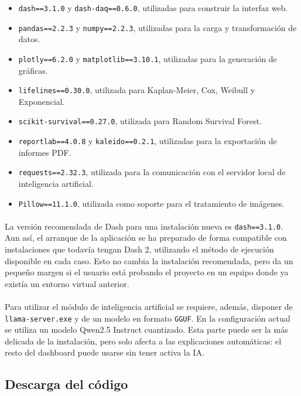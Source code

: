 \begin{itemize}
    \item \texttt{dash==3.1.0} y \texttt{dash-daq==0.6.0}, utilizadas para construir la interfaz web.
    \item \texttt{pandas==2.2.3} y \texttt{numpy==2.2.3}, utilizadas para la carga y transformación de datos.
    \item \texttt{plotly==6.2.0} y \texttt{matplotlib==3.10.1}, utilizadas para la generación de gráficas.
    \item \texttt{lifelines==0.30.0}, utilizada para Kaplan-Meier, Cox, Weibull y Exponencial.
    \item \texttt{scikit-survival==0.27.0}, utilizada para Random Survival Forest.
    \item \texttt{reportlab==4.0.8} y \texttt{kaleido==0.2.1}, utilizadas para la exportación de informes PDF.
    \item \texttt{requests==2.32.3}, utilizada para la comunicación con el servidor local de inteligencia artificial.
    \item \texttt{Pillow==11.1.0}, utilizada como soporte para el tratamiento de imágenes.
\end{itemize}

\paragraph*{}La versión recomendada de Dash para una instalación nueva es \texttt{dash==3.1.0}. Aun así, el arranque de la aplicación se ha preparado de forma compatible con instalaciones que todavía tengan Dash 2, utilizando el método de ejecución disponible en cada caso. Esto no cambia la instalación recomendada, pero da un pequeño margen si el usuario está probando el proyecto en un equipo donde ya existía un entorno virtual anterior.

\paragraph*{}Para utilizar el módulo de inteligencia artificial se requiere, además, disponer de \texttt{llama-server.exe} y de un modelo en formato \texttt{GGUF}. En la configuración actual se utiliza un modelo Qwen2.5 Instruct cuantizado. Esta parte puede ser la más delicada de la instalación, pero solo afecta a las explicaciones automáticas: el resto del dashboard puede usarse sin tener activa la IA.

\subsection{Descarga del código}

